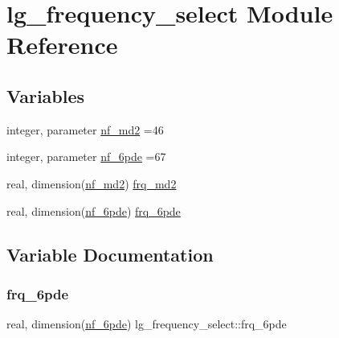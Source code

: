 \hypertarget{namespacelg__frequency__select}{}\section{lg\+\_\+frequency\+\_\+select Module Reference}
\label{namespacelg__frequency__select}
\subsection*{Variables}
\begin{DoxyCompactItemize}
\item 
integer, parameter \hyperlink{namespacelg__frequency__select_ae72bcd5e146b6a04a0710200a495ff37}{nf\+\_\+md2} =46
\item 
integer, parameter \hyperlink{namespacelg__frequency__select_a818527c2ee0dfa5437912455428b1e26}{nf\+\_\+6pde} =67
\item 
real, dimension(\hyperlink{namespacelg__frequency__select_ae72bcd5e146b6a04a0710200a495ff37}{nf\+\_\+md2}) \hyperlink{namespacelg__frequency__select_aecc56fd88fc350f0a438427a684bc458}{frq\+\_\+md2}
\item 
real, dimension(\hyperlink{namespacelg__frequency__select_a818527c2ee0dfa5437912455428b1e26}{nf\+\_\+6pde}) \hyperlink{namespacelg__frequency__select_a763dede7194d9d24009ee6fe23532178}{frq\+\_\+6pde}
\end{DoxyCompactItemize}


\subsection{Variable Documentation}
\mbox{\label{namespacelg__frequency__select_a763dede7194d9d24009ee6fe23532178}} 
\subsubsection{\texorpdfstring{frq\+\_\+6pde}{frq\_6pde}}
{\footnotesize\ttfamily real, dimension(\hyperlink{namespacelg__frequency__select_a818527c2ee0dfa5437912455428b1e26}{nf\+\_\+6pde}) lg\+\_\+frequency\+\_\+select\+::frq\+\_\+6pde}

\mbox{\label{namespacelg__frequency__select_aecc56fd88fc350f0a438427a684bc458}} 
